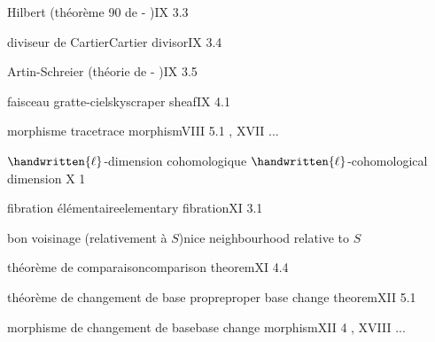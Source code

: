 Hilbert (théorème 90 de - )\quad IX 3.3

diviseur de Cartier\quad Cartier divisor\quad IX 3.4

Artin-Schreier (théorie de - )\quad IX 3.5


faisceau gratte-ciel\quad skyscraper sheaf\quad IX 4.1

morphisme trace\quad trace morphism\quad VIII 5.1 , XVII ...
\margin{\handwritten{*}}

$\handwritten{\ell}$-dimension cohomologique \quad $\handwritten{\ell}$-cohomological dimension \quad X 1
\margin{\handwritten{$\ell$}}

\margin{\handwritten{$\ell$}}

fibration élémentaire\quad elementary fibration\quad XI 3.1

bon voisinage (relativement à $S$)\quad nice neighbourhood relative to $S$\quad {}

théorème de comparaison\quad comparison theorem\quad XI 4.4



théorème de changement de base propre\quad proper base change theorem\quad XII 5.1

morphisme de changement de base\quad base change morphism\quad XII 4 , XVIII ...
\margin{\handwritten{*}}

